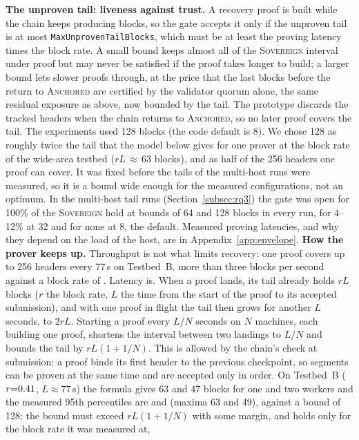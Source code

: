 \textbf{The unproven tail: liveness against trust.} A recovery proof is built
while the chain keeps producing blocks, so the gate accepts it only if the
unproven tail is at most \texttt{MaxUnprovenTailBlocks}, which must be at least
the proving latency times the block rate. A small bound keeps almost all of the
\textsc{Sovereign} interval under proof but may never be satisfied if the proof
takes longer to build; a larger bound lets slower proofs through, at the price
that the last blocks before the return to \textsc{Anchored} are certified by the
validator quorum alone, the same residual exposure as above, now bounded by the
tail. The prototype discards the tracked headers when the chain returns to
\textsc{Anchored}, so no later proof covers the tail. The experiments used 128 blocks (the code default is 8). We chose 128 as roughly twice the tail
that the model below gives for one prover at the block rate of the wide-area testbed ($rL\,{\approx}\,63$
blocks), and as half of the 256 headers one proof can cover. It was fixed before the tails of the
multi-host runs were measured, so it is a bound wide enough for the measured configurations, not an
optimum. In the multi-host tail runs (Section~\ref{subsec:rq3}) the gate was open for 100\% of the \textsc{Sovereign} hold at bounds of 64 and 128 blocks in every run, for 4--12\% at 32 and for none at 8, the default. Measured proving
latencies, and why they depend on the load of the host, are in
Appendix~\ref{app:envelope}.
\textbf{How the prover keeps up.} Throughput is not what limits recovery: one proof covers
up to 256 headers every 77\,s on Testbed~B, more than three blocks per second against a block rate of
\resCloudRate. Latency is. When a proof lands, its tail already holds $rL$ blocks ($r$ the block rate,
$L$ the time from the start of the proof to its accepted submission), and with one proof in flight the
tail then grows for another $L$ seconds, to $2rL$. Starting a proof every $L/N$ seconds on $N$ machines,
each building one proof, shortens the interval between two landings to $L/N$ and bounds the tail by
$rL(1+1/N)$. This is allowed by the chain's check at submission: a proof binds its first header to the
previous checkpoint, so segments can be proven at the same time and are accepted only in order. On Testbed~B
($r{=}0.41$, $L{\approx}77$\,s) the formula gives 63 and 47 blocks for one and two workers and the
measured 95th percentiles are \resCloudTailOne{} and \resCloudTailTwo{} (maxima 63 and 49), against a bound of 128;
the bound must exceed $rL(1+1/N)$ with some margin, and holds only for the block rate it was measured at,
